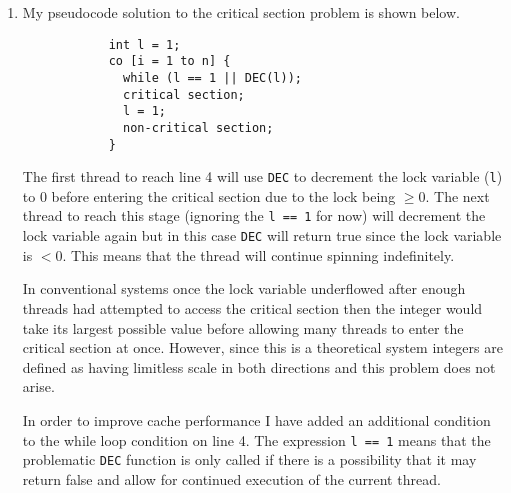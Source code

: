 \documentclass[12pt, a4paper]{article}
\begin{document}
\begin{enumerate}
\begin{description}
        \end{description}

    \item

        My pseudocode solution to the critical section problem is shown below.

        \begin{verbatim}
            int l = 1;
            co [i = 1 to n] {
              while (l == 1 || DEC(l));
              critical section;
              l = 1;
              non-critical section;
            }
        \end{verbatim}

        The first thread to reach line 4 will use \texttt{DEC} to decrement the
        lock variable (\texttt{l}) to 0 before entering the critical section
        due to the lock being $\geq 0$. The next thread to reach this stage
        (ignoring the \texttt{l == 1} for now) will decrement the lock variable
        again but in this case \texttt{DEC} will return true since the lock
        variable is $< 0$. This means that the thread will continue spinning
        indefinitely.

		In conventional systems once the lock variable underflowed after enough
		threads had attempted to access the critical section then the integer
		would take its largest possible value before allowing many threads to
		enter the critical section at once. However, since this is
		a theoretical system integers are defined as having limitless scale in
		both directions and this problem does not arise.

        In order to improve cache performance I have added an additional
        condition to the while loop condition on line 4. The expression
        \texttt{l == 1} means that the problematic \texttt{DEC} function is
        only called if there is a possibility that it may return false and
        allow for continued execution of the current thread.

\end{enumerate}
\end{document}
